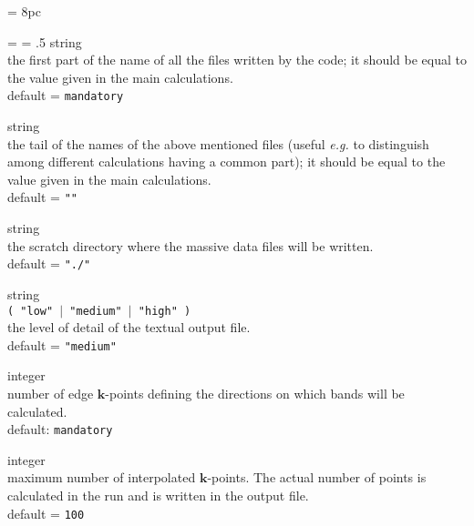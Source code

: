 \newdimen\descindent \descindent = 8pc
{\noindent \leftskip = \descindent \parskip = .5\baselineskip
{}%
{\sc string} \\ the first part of the name of all the files written by the code;
              it should be equal to the value given in the main calculations.\\
{\sc default} = {\tt mandatory} \par

\noindent{}%
{\sc string} \\ the tail of the names of the above mentioned files (useful
    {\it e.g.} to distinguish among different calculations having a common part);
    it should be equal to the value given in the main calculations.\\
    {\sc default} = {\tt ""} \par

\noindent{}%
{\sc string} \\ the scratch directory where the massive data files will be written.\\
              {\sc default} = {\tt "./"} \par

\noindent{}%
{\sc string} \\ {\tt ( "low" $\mid$ "medium" $\mid$ "high" ) }\\
              the level of detail of the textual output file.\\
              {\sc default} =  {\tt "medium"} \par

\noindent{}%
{\sc integer} \\ number of edge $\mathbf{k}$-points defining the directions
on which bands will be calculated.\\
{\sc default}: {\tt mandatory} \par

\noindent{}%
{\sc integer} \\ maximum number of interpolated $\mathbf{k}$-points. The actual number
of points is calculated in the run and is written in the output file.\\
{\sc default} = {\tt 100} \par

}\bigskip

